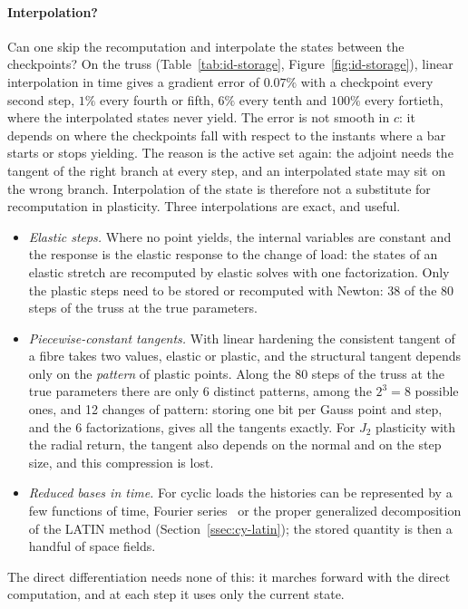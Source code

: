 \paragraph{Interpolation?}
Can one skip the recomputation and interpolate the states between the
checkpoints? On the truss (Table~\ref{tab:id-storage}, Figure~\ref{fig:id-storage}),
linear interpolation in time gives a gradient error of $0.07\%$ with a checkpoint
every second step, $1\%$ every fourth or fifth, $6\%$ every tenth and $100\%$ every
fortieth, where the interpolated states never yield. The error is not smooth in
$c$: it depends on where the checkpoints fall with respect to the instants where
a bar starts or stops yielding. The reason is the active set again: the adjoint
needs the tangent of the right branch at every step, and an interpolated state
may sit on the wrong branch. Interpolation of the state is therefore not a
substitute for recomputation in plasticity. Three interpolations are exact, and
useful.
\begin{itemize}
  \item \emph{Elastic steps.} Where no point yields, the internal variables are
  constant and the response is the elastic response to the change of load: the
  states of an elastic stretch are recomputed by elastic solves with one
  factorization. Only the plastic steps need to be stored or recomputed with
  Newton: 38 of the 80 steps of the truss at the true parameters.
  \item \emph{Piecewise-constant tangents.} With linear hardening the consistent
  tangent of a fibre takes two values, elastic or plastic, and the structural
  tangent depends only on the \emph{pattern} of plastic points. Along the 80 steps
  of the truss at the true parameters there are only 6 distinct patterns, among
  the $2^3=8$ possible ones, and 12 changes of pattern: storing one bit per Gauss
  point and step, and the 6 factorizations, gives all the tangents exactly. For
  $J_2$ plasticity with the radial return, the tangent also depends on the
  normal and on the step size, and this compression is lost.
  \item \emph{Reduced bases in time.} For cyclic loads the histories can be
  represented by a few functions of time, Fourier
  series~\cite{MaitournamPommierThomas2002b} or the proper generalized
  decomposition of the LATIN method (Section~\ref{ssec:cy-latin}); the stored
  quantity is then a handful of space fields.
\end{itemize}
The direct differentiation needs none of this: it marches forward with the direct
computation, and at each step it uses only the current state.

